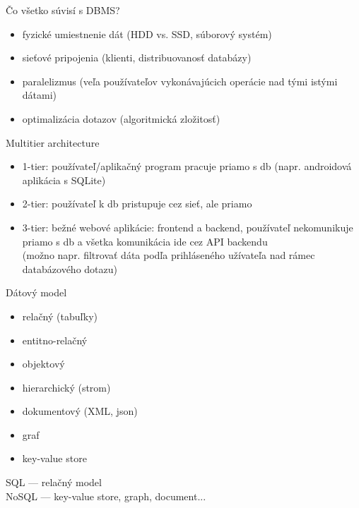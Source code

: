 \documentclass[12pt]{beamer}
\begin{document}
\begin{frame}{Čo všetko súvisí s DBMS?}
\begin{itemize}
\item fyzické umiestnenie dát (HDD vs. SSD, súborový systém)
\item sieťové pripojenia (klienti, distribuovanosť databázy)
\item paralelizmus (veľa používateľov vykonávajúcich operácie nad tými istými dátami)
\item optimalizácia dotazov (algoritmická zložitosť)
\end{itemize}
\end{frame}

\begin{frame}{Multitier architecture}
\begin{itemize}
\item 1-tier: používateľ/aplikačný program pracuje priamo s db (napr. androidová aplikácia s SQLite)
\item 2-tier: používateľ k db pristupuje cez sieť, ale priamo
\pause
\item 3-tier: bežné webové aplikácie: frontend a backend, používateľ nekomunikuje priamo s db a všetka komunikácia ide cez API backendu\\
	(možno napr. filtrovať dáta podľa prihláseného užívateľa nad rámec databázového dotazu)
\end{itemize}
\end{frame}


\begin{frame}{Dátový model}
\begin{itemize}
\item relačný (tabuľky)
\item entitno-relačný
\item objektový
\item hierarchický (strom)
\item dokumentový (XML, json)
\item graf
\item key-value store
\end{itemize}
\bigskip
SQL --- relačný model\\
NoSQL --- key-value store, graph, document...
\end{frame}
\end{document}
